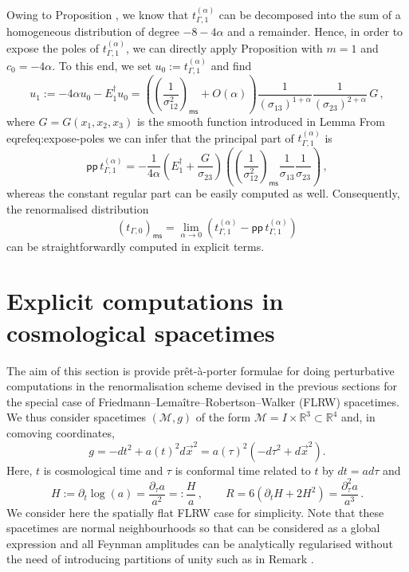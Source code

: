 \documentclass[10pt]{book}
\newcommand{\pp}{\mathsf{pp}}
\newcommand{\ms}{\mathsf{ms}}
\newcommand{\Mcal}{\mathcal{M}}
\theoremstyle{break}
\begin{document}
Owing to Proposition %
, we know that $t_{\Gamma,1}^{(\alpha)}$ can be decomposed into the sum of a homogeneous distribution of degree $-8-4\alpha$ and a remainder. Hence, in order to expose the poles of $t_{\Gamma,1}^{(\alpha)}$,    
we can directly apply Proposition %
with $m=1$ and $c_0 = -4\alpha$. To this end, we set $u_0 := t_{\Gamma,1}^{(\alpha)}$ 
and find 
\[
u_1 := -4\alpha u_0 - E^\dagger_1 u_0   = \left(\left(\frac{1}{\sigma_{12}^{2}} \right)_\ms + O(\alpha) \right) \frac{1}{(\sigma_{13})^{1+\alpha}} \frac{1}{(\sigma_{23})^{2+\alpha}} \,G\,,
\]
where $G=G(x_1,x_2,x_3)$ is the smooth function introduced in Lemma %
From eqref{eq:expose-poles} we can infer that the principal part of $t_{\Gamma,1}^{(\alpha)}$ is
\[
\pp \,t_{\Gamma,1}^{(\alpha)} = -\frac{1}{4\alpha} \left(E^\dagger_1 +\frac{G}{\sigma_{23}}\right) \left( \left(\frac{1}{\sigma_{12}^2}\right)_\ms\frac{1}{\sigma_{13}} \frac{1}{\sigma_{23}}\right)\,,
\]
whereas the constant regular part can be easily computed as well. Consequently, the renormalised distribution
\[
(t_{\Gamma,0})_\ms = \lim_{\alpha\to 0} \left( t_{\Gamma,1}^{(\alpha)} - \pp \,t_{\Gamma,1}^{(\alpha)}   \right)
\]
can be straightforwardly computed in explicit terms.



\section{Explicit computations in cosmological spacetimes}


The aim of this section is provide pr\^et-\`a-porter formulae for doing perturbative computations in the renormalisation scheme devised in the previous sections for the special case of Friedmann--Lema\^itre--Robertson--Walker (FLRW) spacetimes. We thus consider spacetimes $(\Mcal,g)$ of the form $\Mcal=I\times \mathbb{R}^3\subset \mathbb{R}^4$ and, in comoving coordinates,
$$g= -dt^2 + a(t)^2 d\vec{x}^2=a(\tau)^2\left(-d\tau^2+d\vec{x}^2\right).$$
Here, $t$ is cosmological time and $\tau$ is conformal time related to $t$ by $dt = a d\tau$ and 
\begin{equation*}%
H:=\partial_t \log (a) = \frac{\partial_\tau a}{a^2}=:\frac{H}{a}\,,\qquad R=6(\partial_t H + 2 H^2)=\frac{\partial^2_\tau a}{a^3}\,.\end{equation*}
We consider here the spatially flat FLRW case for simplicity. Note that these spacetimes are normal neighbourhoods so that %
can be considered as a global expression and all Feynman amplitudes can be analytically regularised without the need of introducing partitions of unity such as in Remark %
.
\end{document}
